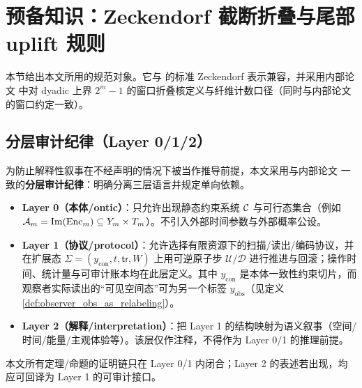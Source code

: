 \section{预备知识：Zeckendorf 截断折叠与尾部 uplift 规则}

本节给出本文所用的规范对象。它与 \cite{Zeckendorf1972,AlloucheShallit2003,Lothaire2002} 的标准 Zeckendorf 表示兼容，并采用内部论文 \cite{Internal2026DyadicZeckendorfWindowFoldingKernel} 中对 dyadic 上界 \(2^m-1\) 的窗口折叠核定义与纤维计数口径（同时与内部论文 \cite{Internal2025ResolutionFoldingPhiPiE} 的窗口约定一致）。

\subsection{分层审计纪律（Layer 0/1/2）}\label{subsec:layer_audit_rule}
为防止解释性叙事在不经声明的情况下被当作推导前提，本文采用与内部论文 \cite{Internal2025StairwayToInfinity} 一致的\textbf{分层审计纪律}：明确分离三层语言并规定单向依赖。
\begin{itemize}
  \item \textbf{Layer 0（本体/ontic）}：只允许出现静态约束系统 \(\mathcal{C}\) 与可行态集合（例如 \(\mathcal A_m=\mathrm{Im}(\mathrm{Enc}_m)\subseteq Y_m\times T_m\)）。不引入外部时间参数与外部概率公设。
  \item \textbf{Layer 1（协议/protocol）}：允许选择有限资源下的扫描/读出/编码协议，并在扩展态 \(\Sigma=(y_{\mathrm{con}},t,\mathsf{tr},W)\) 上用可逆原子步 \(\mathcal U/\mathcal D\) 进行推进与回滚；操作时间、统计量与可审计账本均在此层定义。其中 \(y_{\mathrm{con}}\) 是本体一致性约束切片，而观察者实际读出的“可见空间态”可为另一个标签 \(y_{\mathrm{obs}}\)（见定义 \ref{def:observer_obs_as_relabeling}）。
  \item \textbf{Layer 2（解释/interpretation）}：把 Layer 1 的结构映射为语义叙事（空间/时间/能量/主观体验等）。该层仅作注释，不得作为 Layer 0/1 的推理前提。
\end{itemize}
本文所有定理/命题的证明链只在 Layer 0/1 内闭合；Layer 2 的表述若出现，均应可回译为 Layer 1 的可审计接口。


